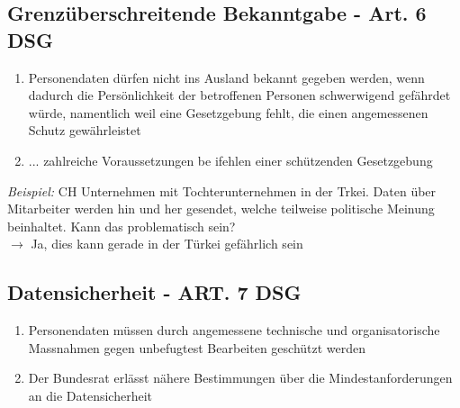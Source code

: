 \documentclass{report}
\theoremstyle{definition}
\theoremstyle{example}
\begin{document}
\subsection{Grenzüberschreitende Bekanntgabe - Art. 6 DSG}
\begin{enumerate}
   \item Personendaten dürfen nicht ins Ausland bekannt gegeben werden, wenn dadurch die Persönlichkeit der betroffenen Personen schwerwigend gefährdet würde, namentlich weil eine Gesetzgebung fehlt, die einen angemessenen Schutz gewährleistet
   \item ... zahlreiche Voraussetzungen be ifehlen einer schützenden Gesetzgebung
\end{enumerate}
\textit{Beispiel:} CH Unternehmen mit Tochterunternehmen in der Trkei. Daten über Mitarbeiter werden hin und her gesendet, welche teilweise politische Meinung beinhaltet. Kann das problematisch sein?\\
$\rightarrow$ Ja, dies kann gerade in der Türkei gefährlich sein

\subsection{Datensicherheit - ART. 7 DSG}
\begin{enumerate}
   \item Personendaten müssen durch angemessene technische und organisatorische Massnahmen gegen unbefugtest Bearbeiten geschützt werden
   \item Der Bundesrat erlässt nähere Bestimmungen über die Mindestanforderungen an die Datensicherheit
\end{enumerate}
\end{document}
